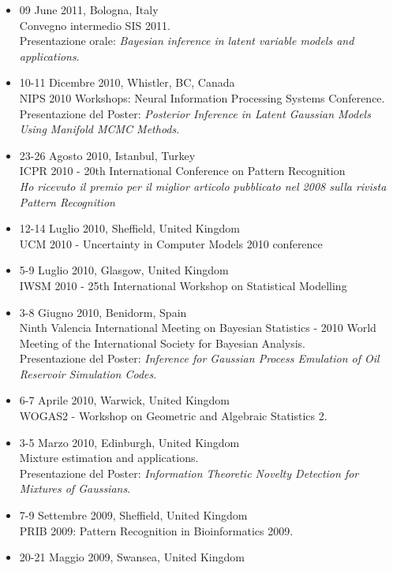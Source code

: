 \documentclass[a4paper,10pt]{article}
\begin{document}
\begin{itemize}
\item 09 June 2011, Bologna, Italy \\
  Convegno intermedio SIS 2011.
  \\Presentazione orale: \emph{Bayesian inference in latent variable models and applications}.
\item 10-11 Dicembre 2010, Whistler, BC, Canada \\
  NIPS 2010 Workshops: Neural Information Processing Systems Conference.
  \\Presentazione del Poster: \emph{Posterior Inference in Latent Gaussian Models Using Manifold MCMC Methods}.
\item 23-26 Agosto 2010, Istanbul, Turkey \\
  ICPR 2010 - 20th International Conference on Pattern Recognition
  \\\emph{Ho ricevuto il premio per il miglior articolo pubblicato nel 2008 sulla rivista Pattern Recognition}
\item 12-14 Luglio 2010, Sheffield, United Kingdom \\
  UCM 2010 - Uncertainty in Computer Models 2010 conference
\item 5-9 Luglio 2010, Glasgow, United Kingdom \\
  IWSM 2010 - 25th International Workshop on Statistical Modelling
\item 3-8 Giugno 2010, Benidorm, Spain \\
  Ninth Valencia International Meeting on Bayesian Statistics - 2010 World Meeting of the International Society for Bayesian Analysis.
  \\Presentazione del Poster: \emph{Inference for Gaussian Process Emulation of Oil Reservoir Simulation Codes}.
\item 6-7 Aprile 2010, Warwick, United Kingdom \\
  WOGAS2 - Workshop on Geometric and Algebraic Statistics 2.
\item 3-5 Marzo 2010, Edinburgh, United Kingdom \\
  Mixture estimation and applications.
  \\Presentazione del Poster: \emph{Information Theoretic Novelty Detection for Mixtures of Gaussians}.
\item 7-9 Settembre 2009, Sheffield, United Kingdom \\
  PRIB 2009: Pattern Recognition in Bioinformatics 2009.
\item 20-21 Maggio 2009, Swansea, United Kingdom \\

\end{itemize}
\end{document}
